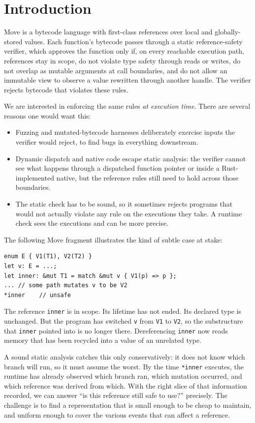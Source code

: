\section{Introduction}\label{sec:intro}

Move is a bytecode language with first-class references over local
and globally-stored values. Each function's bytecode passes through
a static reference-safety verifier, which approves the function only
if, on every reachable execution path, references stay in scope, do
not violate type safety through reads or writes, do not overlap as
mutable arguments at call boundaries, and do not allow an immutable
view to observe a value rewritten through another handle. The
verifier rejects bytecode that violates these rules.

We are interested in enforcing the same rules \emph{at execution
time}. There are several reasons one would want this:
\begin{itemize}
\item Fuzzing and mutated-bytecode harnesses deliberately exercise
inputs the verifier would reject, to find bugs in everything
downstream.
\item Dynamic dispatch and native code escape static analysis: the
verifier cannot see what happens through a dispatched function
pointer or inside a Rust-implemented native, but the reference
rules still need to hold across those boundaries.
\item The static check has to be sound, so it sometimes rejects
programs that would not actually violate any rule on the executions
they take. A runtime check sees the executions and can be more
precise.
\end{itemize}

The following Move fragment illustrates the kind of subtle case at
stake:
\begin{lstlisting}
enum E { V1(T1), V2(T2) }
let v: E = ...;
let inner: &mut T1 = match &mut v { V1(p) => p };
... // some path mutates v to be V2
*inner    // unsafe
\end{lstlisting}
The reference \texttt{inner} is in scope. Its lifetime has not ended.
Its declared type is unchanged. But the program has switched
\texttt{v} from \texttt{V1} to \texttt{V2}, so the substructure that
\texttt{inner} pointed into is no longer there. Dereferencing
\texttt{inner} now reads memory that has been recycled into a value
of an unrelated type.

A sound static analysis catches this only conservatively: it does
not know which branch will run, so it must assume the worst. By the
time \texttt{*inner} executes, the runtime has already observed which
branch ran, which mutation occurred, and which reference was derived
from which. With the right slice of that information recorded, we
can answer ``is this reference still safe to use?'' precisely. The
challenge is to find a representation that is small enough to be
cheap to maintain, and uniform enough to cover the various events
that can affect a reference.

